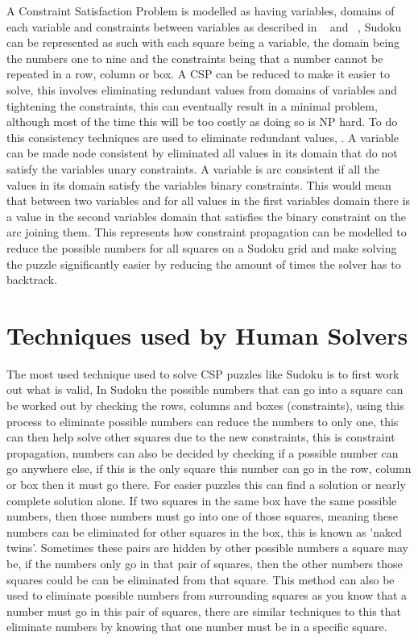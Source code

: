\documentclass[]{final_report}
\begin{document}
A Constraint Satisfaction Problem is modelled as having variables, domains of each variable and constraints between variables as described in ~\cite{RUSSELL:2016} and ~\cite{TSANG:1993}, Sudoku can be represented as such with each square being a variable, the domain being the numbers one to nine and the constraints being that a number cannot be repeated in a row, column or box. A CSP can be reduced to make it easier to solve, this involves eliminating redundant values from domains of variables and tightening the constraints, this can eventually result in a minimal problem, although most of the time this will be too costly as doing so is NP hard. To do this consistency techniques are used to eliminate redundant values, . A variable can be made node consistent by eliminated all values in its domain that do not satisfy the variables unary constraints. A variable is arc consistent if all the values in its domain satisfy the variables binary constraints. This would mean that between two variables and for all values in the first variables domain there is a value in the second variables domain that satisfies the binary constraint on the arc joining them. This represents how constraint propagation can be modelled to reduce the possible numbers for all squares on a Sudoku grid and make solving the puzzle significantly easier by reducing the amount of times the solver has to backtrack.

\section*{Techniques used by Human Solvers}

The most used technique used to solve CSP puzzles like Sudoku is to first work out what is valid, In Sudoku the possible numbers that can go into a square can be worked out by checking the rows, columns and boxes (constraints), using this process to eliminate possible numbers can reduce the numbers to only one, this can then help solve other squares due to the new constraints, this is constraint propagation, numbers can also be decided by checking if a possible number can go anywhere else, if this is the only square this number can go in the row, column or box then it must go there. For easier puzzles this can find a solution or nearly complete solution alone. If two squares in the same box have the same possible numbers, then those numbers must go into one of those squares, meaning these numbers can be eliminated for other squares in the box, this is known as 'naked twins'. Sometimes these pairs are hidden by other possible numbers a square may be, if the numbers only go in that pair of squares, then the other numbers those squares could be can be eliminated from that square. This method can also be used to eliminate possible numbers from surrounding squares as you know that a number must go in this pair of squares, there are similar techniques to this that eliminate numbers by knowing that one number must be in a specific square.
\end{document}
